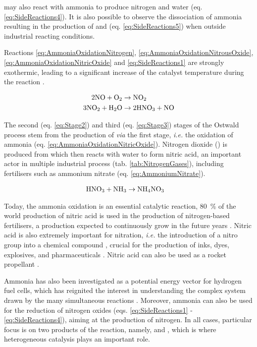  may also react with ammonia to produce nitrogen and water (eq. \ref{eq:SideReactions4}).
It is also possible to observe the dissociation of ammonia resulting in the production of  and  (eq. \ref{eq:SideReactions5}) when outside industrial reacting conditions.

Reactions \ref{eq:AmmoniaOxidationNitrogen}, \ref{eq:AmmoniaOxidationNitrousOxide}, \ref{eq:AmmoniaOxidationNitricOxide} and \ref{eq:SideReactions1} are strongly exothermic, leading to a significant increase of the catalyst temperature during the reaction \parencite{Hatscher2008}.

\begin{align}
    \label{eq:Stage2}
    2 \nitricoxide + \ce{O_2} & \rightarrow \nitrogendioxide \\
    \label{eq:Stage3}
    3 \nitrogendioxide + \water & \rightarrow 2\nitricacid + \nitricoxide
\end{align}

The second (eq. \ref{eq:Stage2}) and third (eq. \ref{eq:Stage3}) stages of the Ostwald process stem from the production of  \textit{via} the first stage, \textit{i.e.} the oxidation of ammonia (eq. \ref{eq:AmmoniaOxidationNitricOxide}).
Nitrogen dioxide (\nitrogendioxide) is produced from  which then reacts with water to form nitric acid, an important actor in multiple industrial process (tab. \ref{tab:NitrogenGases}), including fertilisers such as ammonium nitrate (eq. \ref{eq:AmmoniumNitrate}).

\begin{align}
    \label{eq:AmmoniumNitrate}
    \nitricacid + \ammonia & \rightarrow \ammoniumnitrate
\end{align}

Today, the ammonia oxidation is an essential catalytic reaction, \qty{80}{\percent} of the world production of nitric acid is used in the production of nitrogen-based fertilisers, a production expected to continuously grow in the future years \parencite{Lim2021a}.
Nitric acid is also extremely important for nitration, \textit{i.e.} the introduction of a nitro group into a chemical compound \parencite{Hughes1950}, crucial for the production of inks, dyes, explosives, and pharmaceuticals \parencite{Lee2005, Ouellette2014}.
Nitric acid can also be used as a rocket propellant \parencite{Mason1956, Oommen1999}.

Ammonia has also been investigated as a potential energy vector for hydrogen fuel cells, which has reignited the interest in understanding the complex system drawn by the many simultaneous reactions \parencite{Afif2016, Georgina2021}.
Moreover, ammonia can also be used for the reduction of nitrogen oxides (eqs. \ref{eq:SideReactions1} - \ref{eq:SideReactions4}), aiming at the production of nitrogen.
In all cases, particular focus is on two products of the reaction, namely,  and , which is where heterogeneous catalysis plays an important role.

